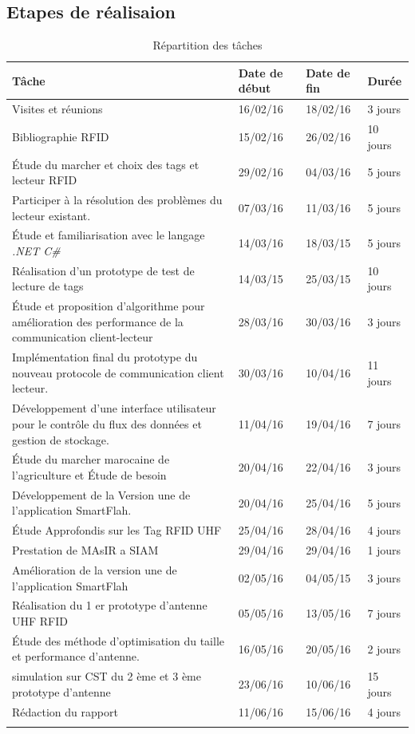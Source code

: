 \documentclass[11pt, a4paper, twoside]{book}
\begin{document}
\subsection{Etapes	de	réalisaion}
\begin{longtable}{|p{}|p{}|p{}| p{}|}
\hline
\textbf{Tâche} & \textbf{Date de début} & \textbf{Date de fin} & \textbf{Durée} \\
\hline
Visites et réunions & 16/02/16 & 18/02/16 & 3 jours \\
\hline
Bibliographie RFID & 15/02/16 & 26/02/16 & 10 jours \\
\hline
Étude du marcher et choix des tags et lecteur RFID & 29/02/16 & 04/03/16 & 5 jours \\
\hline
Participer à  la résolution des problèmes du lecteur existant.
 & 07/03/16 & 11/03/16 & 5 jours \\
\hline
Étude et familiarisation avec le langage \emph{.NET C\#} & 14/03/16 & 18/03/15 & 5 jours \\
\hline
Réalisation d'un prototype de test de lecture de tags & 14/03/15 & 25/03/15 & 10 jours \\
\hline
 Étude et proposition d'algorithme pour amélioration des performance de la communication client-lecteur
 & 28/03/16 & 30/03/16 & 3 jours \\
\hline
Implémentation final du prototype du nouveau protocole de communication client lecteur.
 & 30/03/16 & 10/04/16 & 11 jours \\
\hline
Développement d'une interface utilisateur pour le contrôle du flux des données et gestion de stockage.
 & 11/04/16 & 19/04/16 & 7 jours \\
\hline
Étude du marcher marocaine de l'agriculture et Étude de besoin & 20/04/16 & 22/04/16 & 3 jours \\
\hline
Développement de la Version une de l'application SmartFlah. & 20/04/16 & 25/04/16 & 5 jours \\
\hline
Étude Approfondis sur les Tag RFID UHF  & 25/04/16 & 28/04/16 & 4 jours \\
\hline
Prestation de MAsIR a SIAM  & 29/04/16 & 29/04/16 & 1 jours \\
\hline
Amélioration de la version une de l'application SmartFlah & 02/05/16 & 04/05/15 & 3 jours \\
\hline
Réalisation du 1 er prototype d'antenne UHF RFID & 05/05/16 & 13/05/16 & 7 jours \\
\hline
Étude des méthode d'optimisation du taille et performance d'antenne. & 16/05/16 & 20/05/16 & 2 jours \\
\hline
simulation sur CST du 2 ème et 3 ème prototype d'antenne & 23/06/16 & 10/06/16 & 15 jours \\
\hline
Rédaction du rapport & 11/06/16 & 15/06/16 & 4 jours \\
\hline
\caption{Répartition des tâches}
\end{longtable}
\end{document}
